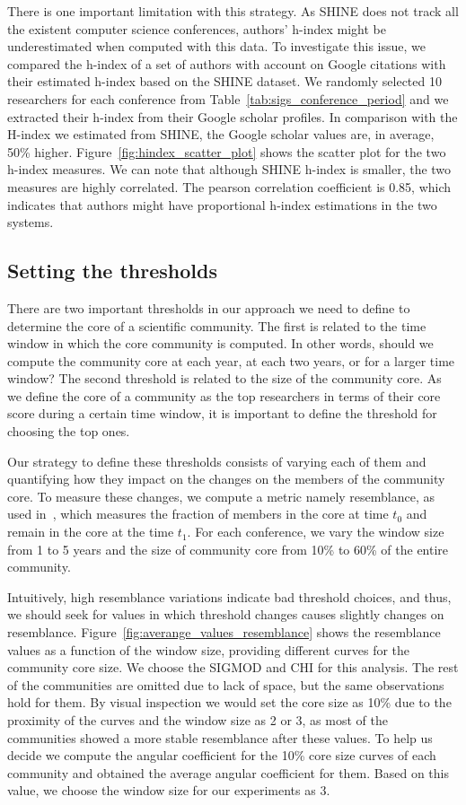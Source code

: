 There is one important limitation with this strategy.  As SHINE does not track all the existent computer science conferences, authors' h-index might be underestimated when computed
with this data. To investigate this issue, we compared the h-index of a set of authors with account on Google citations with their estimated h-index based on the SHINE dataset.  We
randomly selected 10 researchers for each conference from Table~\ref{tab:sigs_conference_period} and we extracted their h-index from their Google scholar profiles.  In comparison
with the H-index we estimated from SHINE, the Google scholar values are, in average, 50\% higher. Figure~\ref{fig:hindex_scatter_plot} shows the scatter plot for the two h-index
measures. We can note that although SHINE h-index is smaller, the two measures are highly correlated. The pearson correlation coefficient is 0.85, which indicates that authors
might have proportional h-index estimations in the two systems. 

\subsection{Setting the thresholds}
\label{sub:thresholds}


There are two important thresholds in our approach we need to define to determine the core of a scientific community.  The first is related to the time window in which the core
community is computed. In other words, should we compute the community core at each year, at each two years, or for a larger time window? The second threshold is related to the
size of the community core. As we define the core of a community as the top researchers in terms of their core score during a certain time window, it is important to define the
threshold for choosing the top ones.

Our strategy to define these thresholds consists of varying each of them and quantifying how they impact on the changes on the members of the community core. To measure these
changes, we compute a metric namely resemblance, as used in~\cite{Viswanath:2009}, which measures the fraction of members in the core at time $t_0$ and remain in the core at the
time $t_1$. For each conference, we vary the window size from 1 to 5 years and the size of community core from 10\% to 60\% of the entire community.

Intuitively, high resemblance variations indicate bad threshold choices, and thus, we should seek for values in which threshold changes causes slightly changes on resemblance.
Figure~\ref{fig:averange_values_resemblance} shows the resemblance values as a function of the window size, providing different curves for the community core size.  We choose the
SIGMOD and CHI for this analysis. The rest of the communities are omitted due to lack of space, but the same observations hold for them. By visual inspection we would set the core
size as 10\% due to the proximity of the curves and the window size as 2 or 3, as most of the communities showed a more stable resemblance after these values. To help us decide we
compute the angular coefficient for the 10\% core size curves of each community and obtained the average angular coefficient for them.  Based on this value, we choose the window
size for our experiments as 3.

